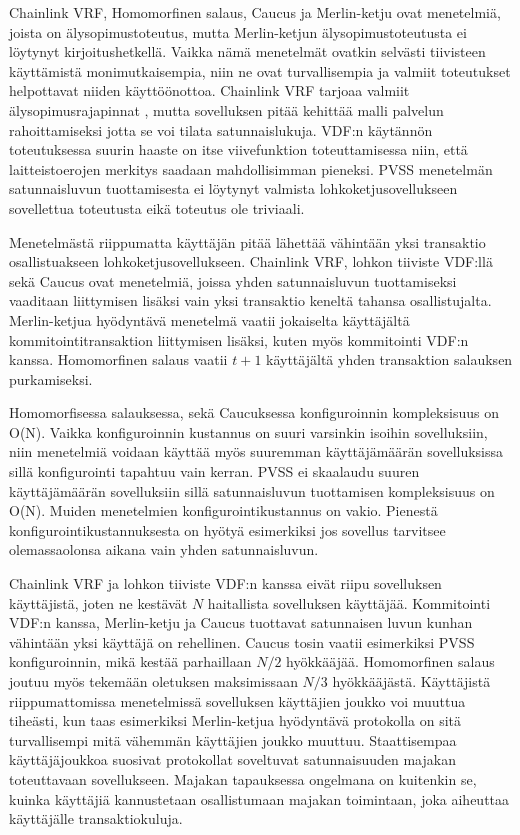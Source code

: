 Chainlink VRF, Homomorfinen salaus, Caucus ja Merlin-ketju ovat menetelmiä, joista on älysopimustoteutus, mutta Merlin-ketjun älysopimustoteutusta ei löytynyt kirjoitushetkellä. Vaikka nämä menetelmät ovatkin selvästi tiivisteen käyttämistä monimutkaisempia, niin ne ovat turvallisempia ja valmiit toteutukset helpottavat niiden käyttöönottoa. Chainlink VRF tarjoaa valmiit älysopimusrajapinnat \cite{noauthor_chainlink_nodate}, mutta sovelluksen pitää kehittää malli palvelun rahoittamiseksi jotta se voi tilata satunnaislukuja. VDF:n käytännön toteutuksessa suurin haaste on itse viivefunktion toteuttamisessa niin, että laitteistoerojen merkitys saadaan mahdollisimman pieneksi. PVSS menetelmän satunnaisluvun tuottamisesta ei löytynyt valmista lohkoketjusovellukseen sovellettua toteutusta eikä toteutus ole triviaali.

Menetelmästä riippumatta käyttäjän pitää lähettää vähintään yksi transaktio osallistuakseen lohkoketjusovellukseen. Chainlink VRF, lohkon tiiviste VDF:llä sekä Caucus ovat menetelmiä, joissa yhden satunnaisluvun tuottamiseksi vaaditaan liittymisen lisäksi vain yksi transaktio keneltä tahansa osallistujalta. Merlin-ketjua hyödyntävä menetelmä vaatii jokaiselta käyttäjältä kommitointitransaktion liittymisen lisäksi, kuten myös kommitointi VDF:n kanssa. Homomorfinen salaus vaatii $t+1$ käyttäjältä yhden transaktion salauksen purkamiseksi. 

Homomorfisessa salauksessa, sekä Caucuksessa konfiguroinnin kompleksisuus on O(N). Vaikka konfiguroinnin kustannus on suuri varsinkin isoihin sovelluksiin, niin menetelmiä voidaan käyttää myös suuremman käyttäjämäärän sovelluksissa sillä konfigurointi tapahtuu vain kerran. PVSS ei skaalaudu suuren käyttäjämäärän sovelluksiin sillä satunnaisluvun tuottamisen kompleksisuus on O(N). Muiden menetelmien konfigurointikustannus on vakio. Pienestä konfigurointikustannuksesta on hyötyä esimerkiksi jos sovellus tarvitsee olemassaolonsa aikana vain yhden satunnaisluvun.

Chainlink VRF ja lohkon tiiviste VDF:n kanssa eivät riipu sovelluksen käyttäjistä, joten ne kestävät $N$ haitallista sovelluksen käyttäjää. Kommitointi VDF:n kanssa, Merlin-ketju ja Caucus tuottavat satunnaisen luvun kunhan vähintään yksi käyttäjä on rehellinen. Caucus tosin vaatii esimerkiksi PVSS konfiguroinnin, mikä kestää parhaillaan $N/2$ hyökkääjää. Homomorfinen salaus joutuu myös tekemään oletuksen maksimissaan $N/3$ hyökkääjästä. Käyttäjistä riippumattomissa menetelmissä sovelluksen käyttäjien joukko voi muuttua tiheästi, kun taas esimerkiksi Merlin-ketjua hyödyntävä protokolla on sitä turvallisempi mitä vähemmän käyttäjien joukko muuttuu. Staattisempaa käyttäjäjoukkoa suosivat protokollat soveltuvat satunnaisuuden majakan toteuttavaan sovellukseen. Majakan tapauksessa ongelmana on kuitenkin se, kuinka käyttäjiä kannustetaan osallistumaan majakan toimintaan, joka aiheuttaa käyttäjälle transaktiokuluja.

